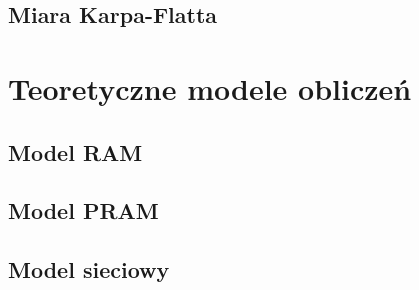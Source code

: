 \subsection{Miara Karpa-Flatta}


\newpage

\section{Teoretyczne modele obliczeń}


\subsection{Model RAM}


\label{subsec:PRAM}
\subsection{Model PRAM}


\subsection{Model sieciowy}



